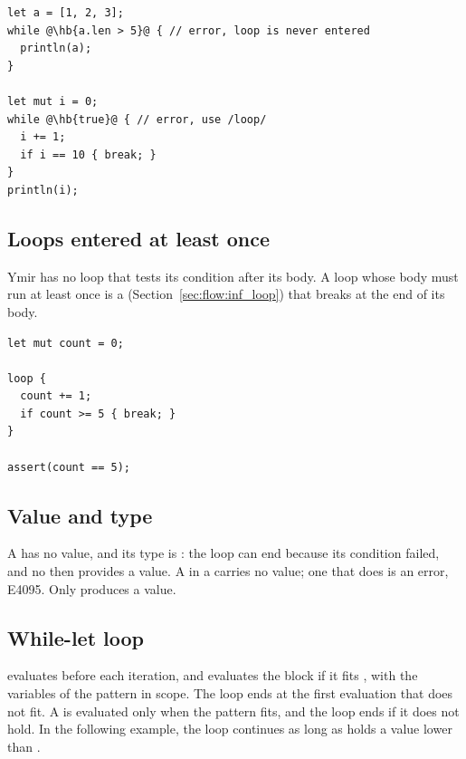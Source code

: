 \begin{lstlisting}[style=coloredverbatimError, escapechar=@]
let a = [1, 2, 3];
while @\hb{a.len > 5}@ { // error, loop is never entered
  println(a);
}

let mut i = 0;
while @\hb{true}@ { // error, use /loop/
  i += 1;
  if i == 10 { break; }
}
println(i);
\end{lstlisting}

\subsection{Loops entered at least once}
\label{sec:flow:loop_at_least_once}

Ymir has no loop that tests its condition after its body. A loop whose body must
run at least once is a  (Section~\ref{sec:flow:inf_loop}) that breaks
at the end of its body.

\begin{lstlisting}[style=coloredverbatim, caption=A loop entered at least once, label=lst:flow:loop_at_least_once]
let mut count = 0;

loop {
  count += 1;
  if count >= 5 { break; }
}

assert(count == 5);
\end{lstlisting}

\subsection{Value and type}
\label{sec:flow:while_value}

A  has no value, and its type is : the loop can end
because its condition failed, and no  then provides a value. A
 in a  carries no value; one that does is an error,
E4095. Only  produces a value.

\subsection{While-let loop}
\label{sec:flow:while_let_loop}

 evaluates  before each iteration,
and evaluates the block if it fits , with the variables of the
pattern in scope. The loop ends at the first evaluation that does not fit. A
 is evaluated only when the pattern fits, and the loop ends if it
does not hold. In the following example, the loop continues as long as 
holds a value lower than .

